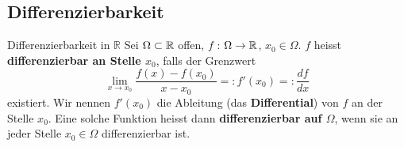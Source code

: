\subsection{Differenzierbarkeit}

\begin{Definition}{Differenzierbarkeit in $ \mathbb{R} $}{}
    Sei $\Omega \subset \mathbb{R}$ offen, $f$ : $\Omega \to \mathbb{R}$, $x_0\in\Omega$. $f$ heisst \textbf{differenzierbar an Stelle $x_0$}, falls der Grenzwert
    \[
    \lim_{x \rightarrow x_0} \frac{f(x) - f(x_0)}{x - x_0} =:
    f'(x_0) =:
    \frac{df}{dx}
    \]
    existiert. Wir nennen $f'(x_0)$ die Ableitung (das \textbf{Differential}) von $f$ an der Stelle $x_0$. Eine solche Funktion heisst dann \textbf{differenzierbar auf $\Omega$}, wenn sie an jeder Stelle $x_0 \in \Omega$ differenzierbar ist.
\end{Definition}

